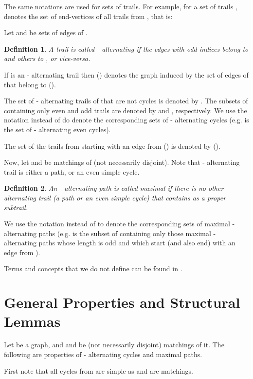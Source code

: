 \documentclass[a4paper, 12pt]{article}
\newtheorem{definition}{Definition}[section]
\begin{document}
The same notations are used for sets of trails. For example, for a
set of trails ,  denotes the set of end-vertices of all
trails from , that is:


Let  and  be sets of edges of .
\begin{definition}\label{alt_trail_definition}
A trail  is called - alternating if the
edges with odd indices belong to  and others to , or vice-versa.
\end{definition}

If  is an - alternating trail then  () denotes
the graph induced by the set of edges of  that belong to 
().

The set of - alternating trails of  that are not cycles is
denoted by . The subsets of  containing only even
and odd trails are denoted by  and ,
respectively. We use the notation  instead of  do denote the
corresponding sets of - alternating cycles (e.g.  is
the set of - alternating even cycles).

The set of the trails from  starting with an edge from 
() is denoted by  ().

Now, let  and  be matchings of  (not necessarily disjoint).
Note that - alternating trail is either a path, or an even
simple cycle.

\begin{definition}\label{max_alt_path_definition}
An - alternating path  is called maximal if there is no
other - alternating trail (a path or an even simple cycle)
that contains  as a proper subtrail.
\end{definition}

We use the notation  instead of  to denote the corresponding
sets of maximal  - alternating paths (e.g.  is
the subset of  containing only those maximal -
alternating paths whose length is odd and which start (and also end)
with an edge from ).

Terms and concepts that we do not define can be found in \cite{Har,
Lov-Plum, West}.


\section{General Properties and Structural Lemmas}

Let  be a graph, and  and  be (not necessarily disjoint)
matchings of it. The following are properties of - alternating
cycles and maximal paths.

\bigskip

First note that all cycles from  are simple as  and 
are matchings.
\end{document}
